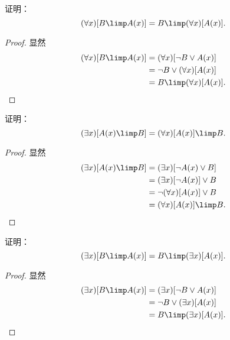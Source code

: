 \begin{example}
证明：\begin{equation}
	(\forall x)[B \limp A(x)]
	= B \limp (\forall x)[A(x)].
\end{equation}
\begin{proof}
显然\begin{align*}
	(\forall x)[B \limp A(x)]
	&= (\forall x)[\neg B \lor A(x)] \\
	&= \neg B \lor (\forall x)[A(x)] \\
	&= B \limp (\forall x)[A(x)].
	\qedhere
\end{align*}
\end{proof}
\end{example}

\begin{example}
证明：\begin{equation}
	(\exists x)[A(x) \limp B]
	= (\forall x)[A(x)] \limp B.
\end{equation}
\begin{proof}
显然\begin{align*}
	(\exists x)[A(x) \limp B]
	&= (\exists x)[\neg A(x) \lor B] \\
	&= (\exists x)[\neg A(x)] \lor B \\
	&= \neg(\forall x)[A(x)] \lor B \\
	&= (\forall x)[A(x)] \limp B.
	\qedhere
\end{align*}
\end{proof}
\end{example}

\begin{example}
证明：\begin{equation}
	(\exists x)[B \limp A(x)]
	= B \limp (\exists x)[A(x)].
\end{equation}
\begin{proof}
显然\begin{align*}
	(\exists x)[B \limp A(x)]
	&= (\exists x)[\neg B \lor A(x)] \\
	&= \neg B \lor (\exists x)[A(x)] \\
	&= B \limp (\exists x)[A(x)].
	\qedhere
\end{align*}
\end{proof}
\end{example}


